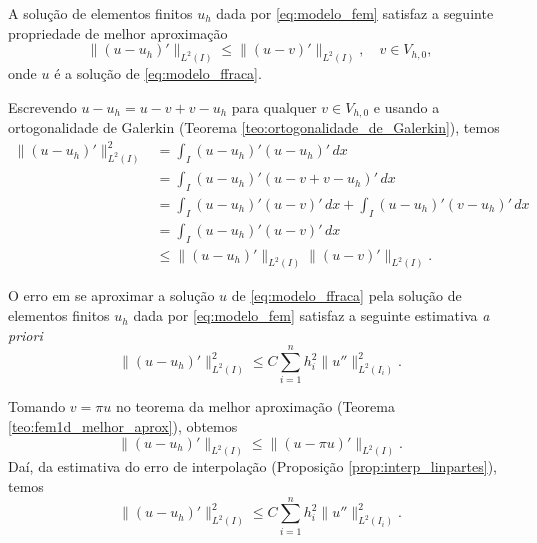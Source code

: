 \begin{teo}\label{teo:fem1d_melhor_aprox}
  A solução de elementos finitos $u_h$ dada por \eqref{eq:modelo_fem} satisfaz a seguinte propriedade de melhor aproximação
  \begin{equation}
    \|(u-u_h)'\|_{L^2(I)} \leq \|(u-v)'\|_{L^2(I)},\quad v\in V_{h,0},\label{eq:modelo_melhor_aprox}
  \end{equation}
onde $u$ é a solução de \eqref{eq:modelo_ffraca}.
\end{teo}
\begin{dem}
  Escrevendo $u-u_h = u-v+v-u_h$ para qualquer $v\in V_{h,0}$ e usando a ortogonalidade de Galerkin (Teorema \ref{teo:ortogonalidade_de_Galerkin}), temos
  \begin{align}
    \|(u-u_h)'\|_{L^2(I)}^2 &= \int_{I} (u-u_h)'(u-u_h)'\,dx\\
    &= \int_I (u-u_h)'(u-v+v-u_h)'\,dx\\
    &= \int_I (u-u_h)'(u-v)'\,dx + \int_I (u-u_h)'(v-u_h)'\,dx\\
    &= \int_I (u-u_h)'(u-v)'\,dx\\
    &\leq \|(u-u_h)'\|_{L^2(I)}\|(u-v)'\|_{L^2(I)}.
  \end{align}
\end{dem}

\begin{teo}
  O erro em se aproximar a solução $u$ de \eqref{eq:modelo_ffraca} pela solução de elementos finitos $u_h$ dada por \eqref{eq:modelo_fem} satisfaz a seguinte estimativa \textit{a priori}
\begin{equation}
  \|(u-u_h)'\|_{L^2(I)}^2 \leq C\sum_{i=1}^n h_i^2\|u''\|_{L^2(I_i)}^2.
\end{equation}
\end{teo}
\begin{dem}
  Tomando $v = \pi u$ no teorema da melhor aproximação (Teorema \ref{teo:fem1d_melhor_aprox}), obtemos
  \begin{equation}
    \|(u-u_h)'\|_{L^2(I)} \leq \|(u-\pi u)'\|_{L^2(I)}.
  \end{equation}
Daí, da estimativa do erro de interpolação (Proposição \ref{prop:interp_linpartes}), temos
\begin{equation}
  \|(u-u_h)'\|_{L^2(I)}^2 \leq C\sum_{i=1}^n h_i^2\|u''\|_{L^2(I_i)}^2.
\end{equation}
\end{dem}


